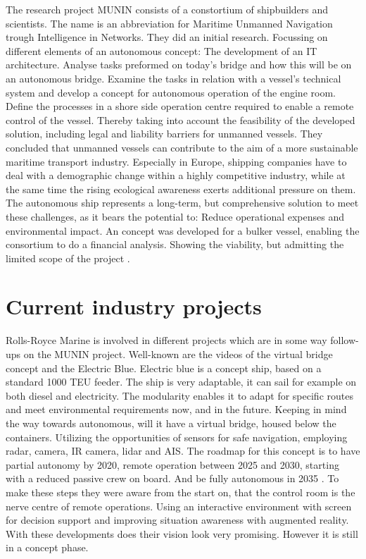The research project MUNIN consists of a constortium of shipbuilders and scientists. The name is an abbreviation for Maritime Unmanned Navigation trough Intelligence in Networks. They did an initial research. Focussing on different elements of an autonomous concept: The development of an IT architecture. Analyse tasks preformed on today's bridge and how this will be on an autonomous bridge. Examine the tasks in relation with a vessel’s technical system and develop a concept for autonomous operation of the engine room. Define the processes in a shore side operation centre required to enable a remote control of the vessel. Thereby taking into account the feasibility of the developed solution, including legal and liability barriers for unmanned vessels.
They concluded that unmanned vessels can contribute to the aim of a more sustainable maritime transport industry. Especially in Europe, shipping companies have to deal with a demographic change within a highly competitive industry, while at the same time the rising ecological awareness exerts additional pressure on them. The autonomous ship represents a long-term, but comprehensive solution to meet these challenges, as it bears the potential to: Reduce operational expenses and
environmental impact.
An concept was developed for a bulker vessel, enabling the consortium to do a financial analysis. Showing the viability, but admitting the limited scope of the project \cite{MUNIN2016}.

\section{Current industry projects}
Rolls-Royce Marine is involved in different projects which are in some way follow-ups on the MUNIN project. Well-known are the videos of the virtual bridge concept and the Electric Blue. Electric blue is a concept ship, based on a standard 1000 \ac{TEU} feeder. The ship is very adaptable, it can sail for example on both diesel and electricity. The modularity enables it to adapt for specific routes and meet environmental requirements now, and in the future. 
Keeping in mind the way towards autonomous, will it have a virtual bridge, housed below the containers. Utilizing the opportunities of sensors for safe navigation, employing radar, camera, IR camera, lidar and \ac{AIS}. The roadmap for this concept is to have partial autonomy by 2020, remote operation between 2025 and 2030, starting with a reduced passive crew on board. And be fully autonomous in 2035 \cite{Wilson2017}. 
To make these steps they were aware from the start on, that the control room is the nerve centre of remote operations. Using an interactive environment with screen for decision support and improving situation awareness with augmented reality. With these developments does their vision look very promising. However it is still in a concept phase.

